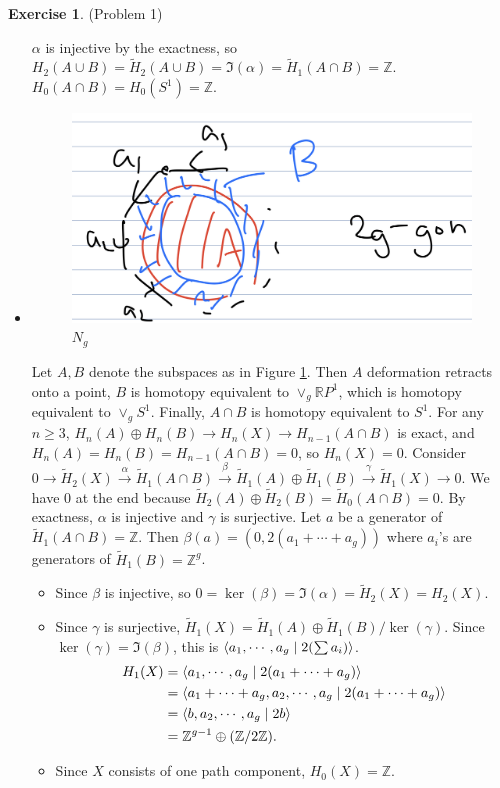 \documentclass[psamsfonts]{amsart}
\theoremstyle{definition}
\newtheorem*{exer}{Exercise}
\theoremstyle{remark}
\numberwithin{equation}{section}
\begin{document}
\begin{exer}{(Problem 1)}
\begin{itemize}
       $\alpha$ is injective by the exactness, so $H_2(A \cup B) = \tilde{H}_2(A \cup B) = \Im(\alpha) = \tilde{H}_1(A \cap B) = \mathbb{Z}$.
       $H_0(A \cap B) = H_0(S^1) = \mathbb{Z}$.
     \item
       \begin{figure}
       \includegraphics[width=.5\linewidth]{2g.jpeg}
       \caption{$N_g$}
       \label{fig:ng}
       \end{figure}
       Let $A, B$ denote the subspaces as in Figure \ref{fig:ng}.
       Then $A$ deformation retracts onto a point, $B$ is homotopy equivalent to $\vee_g \mathbb{R}P^1$, which is homotopy equivalent to $\vee_gS^1$.
       Finally, $A \cap B$ is homotopy equivalent to $S^1$.
       For any $n \geq 3$, $H_n(A) \oplus H_n(B) \rightarrow H_n(X) \rightarrow H_{n - 1}(A \cap B)$ is exact, and $H_n(A) = H_n(B) = H_{n - 1}(A \cap B) = 0$, so $H_n(X) = 0$.
       Consider $0 \rightarrow \tilde{H}_2(X) \xrightarrow{\alpha} \tilde{H}_1(A \cap B) \xrightarrow{\beta} \tilde{H}_1(A) \oplus \tilde{H}_1(B) \xrightarrow{\gamma} \tilde{H}_1(X) \rightarrow 0$.
       We have 0 at the end because $\tilde{H}_2(A) \oplus \tilde{H}_2(B) = \tilde{H}_0(A \cap B) = 0$.
       By exactness, $\alpha$ is injective and $\gamma$ is surjective.
       Let $a$ be a generator of $\tilde{H}_1(A \cap B) = \mathbb{Z}$.
       Then $\beta(a) = (0, 2(a_1 + \cdots + a_g))$ where $a_i$'s are generators of $\tilde{H}_1(B) = \mathbb{Z}^g$.
       \begin{itemize}
         \item
           Since $\beta$ is injective, so $0 = \ker(\beta) = \Im(\alpha) = \tilde{H}_2(X) = H_2(X)$.
         \item
           Since $\gamma$ is surjective, $\tilde{H}_1(X) = \tilde{H}_1(A) \oplus \tilde{H}_1(B) / \ker(\gamma)$.
           Since $\ker(\gamma) = \Im(\beta)$, this is $\ev{a_1, \cdots, a_g \mid 2(\sum a_i)}$.
           \begin{align*}
             H_1(X)
               &= \ev{a_1, \cdots, a_g \mid 2(a_1 + \cdots + a_g)} \\
               &= \ev{a_1 + \cdots + a_g, a_2, \cdots, a_g \mid 2(a_1 + \cdots + a_g)} \\
               &= \ev{b, a_2, \cdots, a_g \mid 2b} \\
               &= \mathbb{Z}^{g - 1} \oplus (\mathbb{Z}/2\mathbb{Z}).
           \end{align*}
         \item
           Since $X$ consists of one path component, $H_0(X) = \mathbb{Z}$.
       \end{itemize}

  \end{itemize}
\end{exer}
\end{document}
